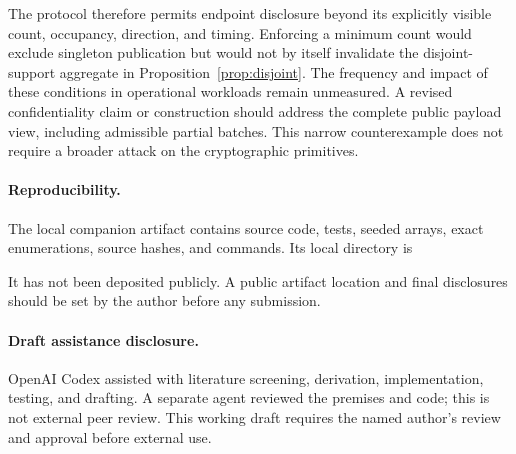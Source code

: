 \documentclass[11pt]{article}
\begin{document}
The protocol therefore permits endpoint disclosure beyond its explicitly
visible count, occupancy, direction, and timing. Enforcing a minimum count
would exclude singleton publication but would not by itself invalidate the
disjoint-support aggregate in Proposition~\ref{prop:disjoint}. The frequency
and impact of these conditions in operational workloads remain unmeasured.
A revised confidentiality claim or construction should address the complete
public payload view, including admissible partial batches. This narrow
counterexample does not require a broader attack on the cryptographic primitives.

\paragraph{Reproducibility.}
The local companion artifact contains source code, tests, seeded arrays, exact
enumerations, source hashes, and commands. Its local directory is
\begin{quote}\small
{}
\end{quote}
It has not been deposited publicly. A public artifact location and final
disclosures should be set by the author before any submission.

\paragraph{Draft assistance disclosure.}
OpenAI Codex assisted with literature screening, derivation, implementation,
testing, and drafting. A separate agent reviewed the premises and code;
this is not external peer review. This working draft requires the named
author's review and approval before external use.

\clearpage


\end{document}
